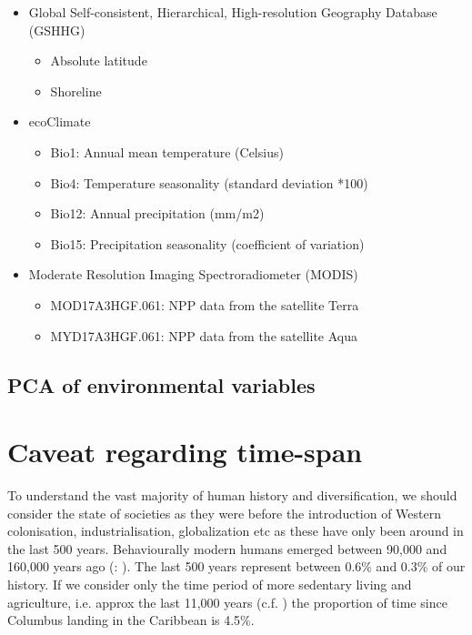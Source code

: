 \documentclass[unnumsec,webpdf,modern,medium]{oup-authoring-template}
\begin{document}
\begin{appendices}
\begin{itemize}
\item Global Self-consistent, Hierarchical, High-resolution Geography Database (GSHHG)
\begin{itemize}
    \item Absolute latitude
    \item Shoreline
\end{itemize}
\item ecoClimate
\begin{itemize}
\item Bio1: Annual mean temperature (Celsius)
\item Bio4: Temperature seasonality (standard deviation *100)
\item Bio12: Annual precipitation (mm/m2)
\item Bio15: Precipitation seasonality (coefficient of variation)
\end{itemize}
\item Moderate Resolution Imaging Spectroradiometer (MODIS)
\begin{itemize}
    \item MOD17A3HGF.061: NPP data from the satellite Terra
    \item MYD17A3HGF.061: NPP data from the satellite Aqua
\end{itemize}
\end{itemize}


\FloatBarrier


\subsection{PCA of environmental variables}
\label{appendix_eniron_PCA}



\section{Caveat regarding time-span}
\label{appendix_time_span}

To understand the vast majority of human history and diversification, we should consider the state of societies as they were before the introduction of Western colonisation, industrialisation, globalization etc as these have only been around in the last 500 years. Behaviourally modern humans emerged between 90,000 and 160,000 years ago (\citet{powell2009late}: \cite{marean2007early}). The last 500 years represent between 0.6\% and 0.3\% of our history. If we consider only the time period of more sedentary living and agriculture, i.e. approx the last 11,000 years (c.f. \citet{kislev2006early}) the proportion of time since Columbus landing in the Caribbean is 4.5\%.


\end{appendices}
\end{document}
